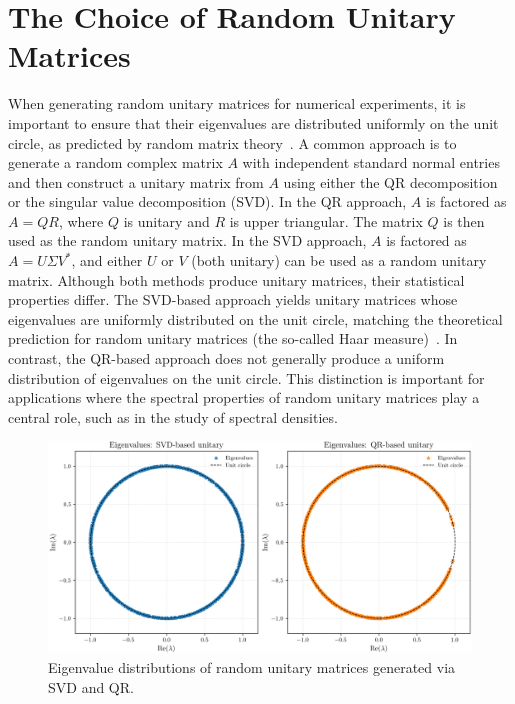 \section{The Choice of Random Unitary Matrices}

When generating random unitary matrices for numerical experiments, it is important to ensure that their eigenvalues are distributed uniformly on the unit circle, as predicted by random matrix theory~\cite{mezzadri2007}. A common approach is to generate a random complex matrix $A$ with independent standard normal entries and then construct a unitary matrix from $A$ using either the QR decomposition or the singular value decomposition (SVD). In the QR approach, $A$ is factored as $A = QR$, where $Q$ is unitary and $R$ is upper triangular. The matrix $Q$ is then used as the random unitary matrix. In the SVD approach, $A$ is factored as $A = U \Sigma V^*$, and either $U$ or $V$ (both unitary) can be used as a random unitary matrix.
Although both methods produce unitary matrices, their statistical properties differ.
The SVD-based approach yields unitary matrices whose eigenvalues are uniformly distributed on the unit circle,
matching the theoretical prediction for random unitary matrices (the so-called Haar measure)~\cite{mezzadri2007}.
In contrast, the QR-based approach does not generally produce a uniform distribution of eigenvalues on the unit circle. This distinction is important for applications where the spectral properties of random unitary matrices play a central role, such as in the study of spectral densities.

\begin{figure}[H]
    \centering
    \includegraphics[width=1\textwidth]{Graphics/eigenvalue_comparison.png}
    \caption{Eigenvalue distributions of random unitary matrices generated via SVD and QR.}
    \label{fig:eigenvalue-comparison}
\end{figure}



